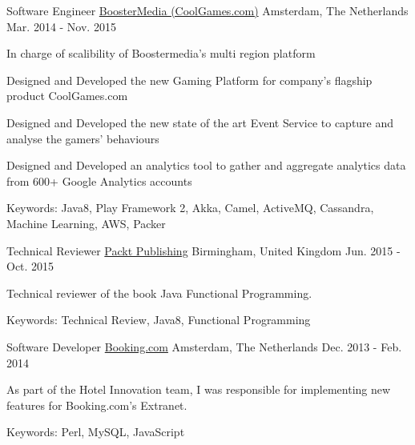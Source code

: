\begin{cventries}
  \cventry
    {Software Engineer} %
    {\href{https://www.coolgames.com/}{BoosterMedia (CoolGames.com)}} %
    {Amsterdam, The Netherlands} %
    {Mar. 2014 - Nov. 2015} %
    {
      \begin{cvitems} %
        \item {In charge of scalibility of Boostermedia's multi region platform}
        \item {Designed and Developed the new Gaming Platform for company's flagship product CoolGames.com}
        \item {Designed and Developed the new state of the art Event Service to capture and analyse the gamers' behaviours}
        \item {Designed and Developed an analytics tool to gather and aggregate analytics data from 600+ Google Analytics accounts}
        \item {Keywords: Java8, Play Framework 2, Akka, Camel, ActiveMQ, Cassandra, Machine Learning, AWS, Packer}
      \end{cvitems}
    }

  \cventry
    {Technical Reviewer} %
    {\href{https://www.packtpub.com/}{Packt Publishing}} %
    {Birmingham, United Kingdom} %
    {Jun. 2015 - Oct. 2015} %
    {
      \begin{cvitems} %
        \item {Technical reviewer of the book Java Functional Programming.}
        \item {Keywords: Technical Review, Java8, Functional Programming}
      \end{cvitems}
    }

  \cventry
    {Software Developer} %
    {\href{https://www.booking.com/}{Booking.com}} %
    {Amsterdam, The Netherlands} %
    {Dec. 2013 - Feb. 2014} %
    {
      \begin{cvitems} %
        \item {As part of the Hotel Innovation team, I was responsible for implementing new features for Booking.com's Extranet.}
        \item {Keywords: Perl, MySQL, JavaScript}
      \end{cvitems}
    }


\end{cventries}
